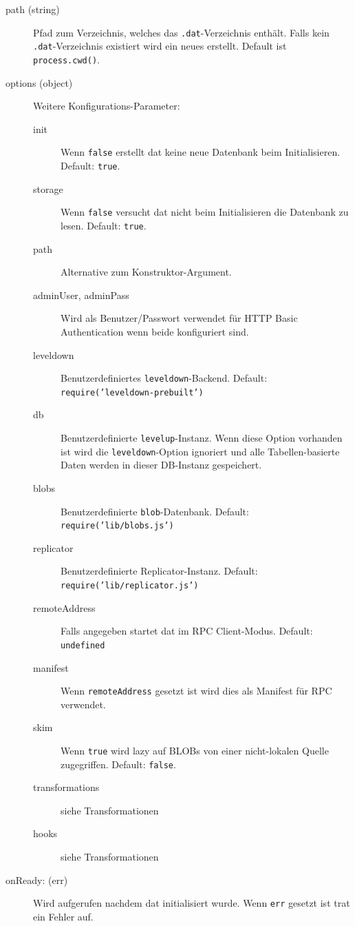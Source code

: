 \begin{description}
\item[path (string)] Pfad zum Verzeichnis, welches das \texttt{.dat}-Verzeichnis enthält. Falls kein \texttt{.dat}-Verzeichnis existiert wird ein neues erstellt. Default ist \texttt{process.cwd()}.
\item[options (object)] Weitere Konfigurations-Parameter:
    \begin{description}
    \item[init] Wenn \texttt{false} erstellt dat keine neue Datenbank beim Initialisieren. Default: \texttt{true}.
    \item[storage] Wenn \texttt{false} versucht dat nicht beim Initialisieren die Datenbank zu lesen. Default: \texttt{true}.
    \item[path] Alternative zum Konstruktor-Argument.
    \item[adminUser, adminPass] Wird als Benutzer/Passwort verwendet für HTTP Basic Authentication wenn beide konfiguriert sind.
    \item[leveldown] Benutzerdefiniertes \texttt{leveldown}-Backend. Default: \texttt{require('leveldown-prebuilt')}
    \item[db] Benutzerdefinierte \texttt{levelup}-Instanz. Wenn diese Option vorhanden ist wird die \texttt{leveldown}-Option ignoriert und alle Tabellen-basierte Daten werden in dieser DB-Instanz gespeichert.
    \item[blobs] Benutzerdefinierte \texttt{blob}-Datenbank. Default: \texttt{require('lib/blobs.js')}
    \item[replicator] Benutzerdefinierte Replicator-Instanz. Default: \texttt{require('lib/replicator.js')}
    \item[remoteAddress] Falls angegeben startet dat im RPC Client-Modus. Default: \texttt{undefined}
    \item[manifest] Wenn \texttt{remoteAddress} gesetzt ist wird dies als Manifest für RPC verwendet.
    \item[skim] Wenn \texttt{true} wird lazy auf BLOBs von einer nicht-lokalen Quelle zugegriffen. Default: \texttt{false}.
    \item[transformations] siehe Transformationen
    \item[hooks] siehe Transformationen
    \end{description}
\item[onReady: (err)] Wird aufgerufen nachdem dat initialisiert wurde. Wenn \texttt{err} gesetzt ist trat ein Fehler auf.
\end{description}
 
